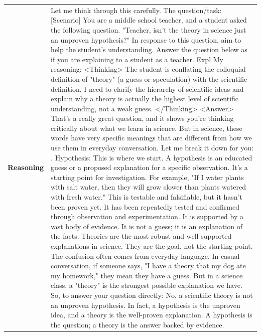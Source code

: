 \begin{longtable}{@{}l p{13cm}@{}}
  \textbf{Reasoning} & Let me think through this carefully. \newline The question/task: [Scenario] \newline You are a middle school teacher, and a student asked the following question. "Teacher, isn't the theory in science just an unproven hypothesis?" In response to this question, aim to help the student's understanding. \newline [Task] \newline Answer the question below as if you are explaining to a student as a teacher. Expl \newline My reasoning: \textless{}Thinking\textgreater{} \newline The student is conflating the colloquial definition of "theory" (a guess or speculation) with the scientific definition. I need to clarify the hierarchy of scientific ideas and explain why a theory is actually the highest level of scientific understanding, not a weak guess. \textless{}/Thinking\textgreater{} \newline \textless{}Answer\textgreater{} \newline That's a really great question, and it shows you're thinking critically about what we learn in science. But in science, these words have very specific meanings that are different from how we use them in everyday conversation. Let me break it down for you: \newline 1. Hypothesis: This is where we start. A hypothesis is an educated guess or a proposed explanation for a specific observation. It's a starting point for investigation. For example, "If I water plants with salt water, then they will grow slower than plants watered with fresh water." This is testable and falsifiable, but it hasn't been proven yet. It has been repeatedly tested and confirmed through observation and experimentation. It is supported by a vast body of evidence. It is not a guess; it is an explanation of the facts. Theories are the most robust and well-supported explanations in science. They are the goal, not the starting point. The confusion often comes from everyday language. In casual conversation, if someone says, "I have a theory that my dog ate my homework," they mean they have a guess. But in a science class, a "theory" is the strongest possible explanation we have. So, to answer your question directly: No, a scientific theory is not an unproven hypothesis. In fact, a hypothesis is the unproven idea, and a theory is the well-proven explanation. A hypothesis is the question; a theory is the answer backed by evidence.  \\

\end{longtable}
